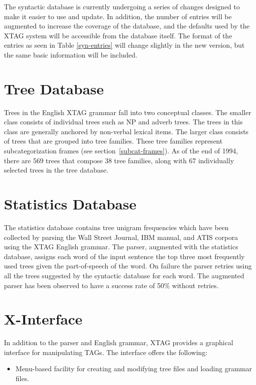 {The syntactic database is currently undergoing a series of changes designed to
make it easier to use and update.  In addition, the number of entries will be
augmented to increase the coverage of the database, and the defaults used by
the XTAG system will be accessible from the database itself.  The format of the
entries as seen in Table \ref{syn-entries} will change slightly in the new
version, but the same basic information will be included.

\section{Tree Database} 
\label{tree-db}
Trees in the English XTAG grammar fall into two conceptual classes.  The
smaller class consists of individual trees such as NP and adverb trees.  The
trees in this class are generally anchored by non-verbal lexical items. The
larger class consists of trees that are grouped into tree families.  These tree
families represent subcategorization frames (see section~\ref{subcat-frames}).
As of the end of 1994, there are 569 trees that compose 38 tree families, along
with 67 individually selected trees in the tree database.


\section{Statistics Database}
\label{stat-db}
The statistics database contains tree unigram frequencies which have been
collected by parsing the Wall Street Journal, IBM manual, and ATIS corpora
using the XTAG English grammar. The parser, augmented with the statistics
database, assigns each word of the input sentence the top three most frequently
used trees given the part-of-speech of the word. On failure the parser retries
using all the trees suggested by the syntactic database for each word.  The
augmented parser has been observed to have a success rate of 50\% without
retries.

\section{X-Interface}

In addition to the parser and English grammar, XTAG provides a graphical
interface for manipulating TAGs.  The interface offers the following:

\begin{itemize}

\item Menu-based facility for creating and modifying tree files and 
loading grammar files.


\end{itemize}}
